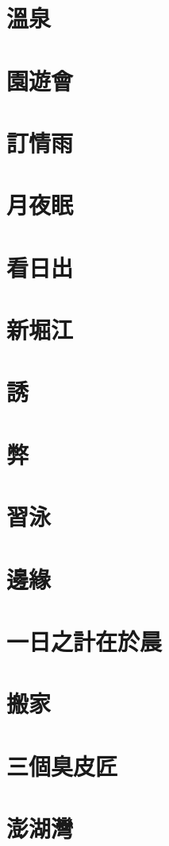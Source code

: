 \documentclass[hyperref]{ctexbook}
\begin{document}
\chapter{溫泉}
\chapter{園遊會}
\chapter{訂情雨}
\chapter{月夜眠}
\chapter{看日出}
\chapter{新堀江}
\chapter{誘}
\chapter{弊}
\chapter{習泳}
\chapter{邊緣}
\chapter{一日之計在於晨}
\chapter{搬家}
\chapter{三個臭皮匠}
\chapter{澎湖灣}
\end{document}
